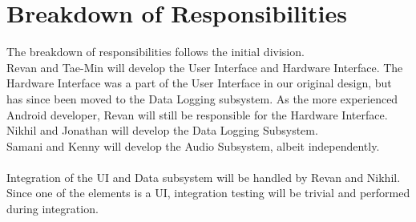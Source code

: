 \documentclass[letterpaper,english, 12pt]{scrreprt}
\begin{document}
\section{Breakdown of Responsibilities}
The breakdown of responsibilities follows the initial division.
\\
Revan and Tae-Min will develop the User Interface and Hardware Interface.
The Hardware Interface was a part of the User Interface in our original design, but has since been moved to the Data Logging subsystem.
As the more experienced Android developer, Revan will still be responsible for the Hardware Interface.
\\
Nikhil and Jonathan will develop the Data Logging Subsystem.
\\
Samani and Kenny will develop the Audio Subsystem, albeit independently.
\\
\\
Integration of the UI and Data subsystem will be handled by Revan and Nikhil.
\\
Since one of the elements is a UI, integration testing will be trivial and performed during integration.
\end{document}
